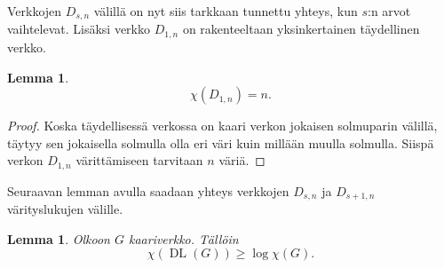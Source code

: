 \documentclass[finnish]{tktltiki2}
\newtheorem{lem}[lau]{Lemma}
\theoremstyle{definition}
\theoremstyle{remark}
\DeclareMathOperator{\DL}{DL}
\newcommand{\Dsn}{D_{s,n}}
\newcommand{\Dssn}{D_{s+1,n}}
\begin{document}

Verkkojen $\Dsn$ välillä on nyt siis tarkkaan tunnettu yhteys, kun $s$:n arvot
vaihtelevat. Lisäksi verkko $D_{1,n}$ on rakenteeltaan yksinkertainen
täydellinen verkko.

\begin{lem}
    \begin{equation*}
        \chi(D_{1,n}) = n.
    \end{equation*}
\end{lem}

\begin{proof}
    Koska täydellisessä verkossa on kaari verkon jokaisen solmuparin välillä,
    täytyy sen jokaisella solmulla olla eri väri kuin millään muulla solmulla.
    Siispä verkon $D_{1,n}$ värittämiseen tarvitaan $n$ väriä.
\end{proof}

Seuraavan lemman avulla saadaan yhteys verkkojen $\Dsn$ ja $\Dssn$
vä\-ri\-tys\-lu\-ku\-jen välille.

\newcommand{\DLG}{\DL(G)}

\begin{lem}
    Olkoon $G$ kaariverkko. Tällöin
    \begin{equation*}
        \chi(\DLG) \geq \log \chi(G).
    \end{equation*}
\end{lem}
\end{document}
